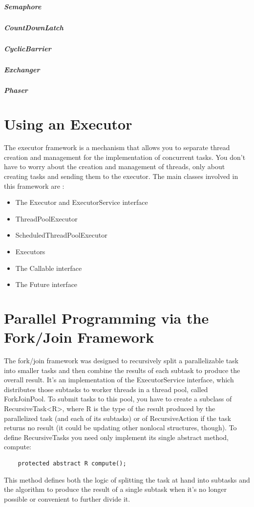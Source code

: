 \subparagraph{Semaphore}
\subparagraph{CountDownLatch}
\subparagraph{CyclicBarrier}
\subparagraph{Exchanger}
\subparagraph{Phaser}

\section{Using an Executor}

The executor framework is a mechanism that allows you to separate thread creation and management for the implementation of concurrent tasks. You don't have to worry about the creation and management of threads, only about creating tasks and sending them to the executor. The main classes involved in this framework are \cite{FernandezGonzalez}:

\begin{itemize}
\item The Executor and ExecutorService interface
\item ThreadPoolExecutor
\item ScheduledThreadPoolExecutor
\item Executors
\item The Callable interface
\item The Future interface
\end{itemize}

\section{Parallel Programming via the Fork/Join Framework}

The fork/join framework was designed to recursively split a parallelizable task into smaller tasks and then combine the results of each subtask to produce the overall result. It’s an implementation of the ExecutorService interface, which distributes those subtasks to worker threads in a thread pool, called ForkJoinPool. To submit tasks to this pool, you have to create a subclass of RecursiveTask<R>, where R is the type of the result produced by the parallelized task (and each of its subtasks) or of RecursiveAction if the task returns no result (it could be updating other nonlocal structures, though). To define RecursiveTasks you need only implement its single abstract method, compute:

\begin{lstlisting}
	protected abstract R compute();
\end{lstlisting}

This method defines both the logic of splitting the task at hand into subtasks and the algorithm to produce the result of a single subtask when it’s no longer possible or convenient to further divide it. \cite{urma2014java}